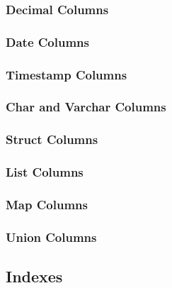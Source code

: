 \documentclass{article}
\begin{document}
\subsubsection{Decimal Columns}

\subsubsection{Date Columns}

\subsubsection{Timestamp Columns}
\subsubsection{Char and Varchar Columns}

\subsubsection{Struct Columns}
\subsubsection{List Columns}
\subsubsection{Map Columns}
\subsubsection{Union Columns}

\subsection{Indexes}
\end{document}
